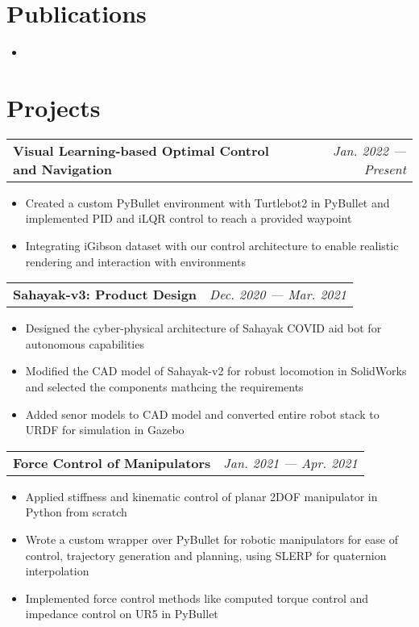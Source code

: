 \documentclass[a4paper,11pt]{article}
\makeatletter
\newcommand{\resumeItem}[2]{
  \item\small{
    \textbf{#1}{#2 \vspace{-5pt}}
  }
}
\newcommand{\projectHeading}[2]{
\vspace{-1pt}
    \begin{tabular*}{0.99\textwidth}[t]{l@{\extracolsep{\fill}}r}
      \textbf{#1} & \textit{\small #2} \\
    \end{tabular*}\vspace{-6pt}





}
\newcommand{\resumeItemListStart}{\begin{itemize}}
\newcommand{\resumeItemListEnd}{\end{itemize}\vspace{1pt}}
\makeatother
\begin{document}
\section{Publications}

    \resumeItemListStart
        \resumeItem{}{}
    \resumeItemListEnd



\section{Projects}

    \projectHeading
        {Visual Learning-based Optimal Control and Navigation}{Jan. 2022 --- Present}
        \resumeItemListStart
            \resumeItem{}{Created a custom PyBullet environment with Turtlebot2 in PyBullet and implemented PID and iLQR control to reach a provided waypoint}
            \resumeItem{}{Integrating iGibson dataset with our control architecture to enable realistic rendering and interaction with environments}
        \resumeItemListEnd
        
    \projectHeading
        {Sahayak-v3: Product Design}{Dec. 2020 --- Mar. 2021}
        \resumeItemListStart
            \resumeItem{}{Designed the cyber-physical architecture of Sahayak COVID aid bot for autonomous capabilities}
            \resumeItem{}{Modified the CAD model of Sahayak-v2 for robust locomotion in SolidWorks and selected the components mathcing the requirements}
            \resumeItem{}{Added senor models to CAD model and converted entire robot stack to URDF for simulation in Gazebo}
        \resumeItemListEnd        

    \projectHeading
        {Force Control of Manipulators}{Jan. 2021 --- Apr. 2021}
        \resumeItemListStart
            \resumeItem{}{Applied stiffness and kinematic control of planar 2DOF manipulator in Python from scratch}
            \resumeItem{}{Wrote a custom wrapper over PyBullet for robotic manipulators for ease of control, trajectory generation and planning, using SLERP for quaternion interpolation}
            \resumeItem{}{Implemented force control methods like computed torque control and impedance control on UR5 in PyBullet}
        \resumeItemListEnd
\end{document}
